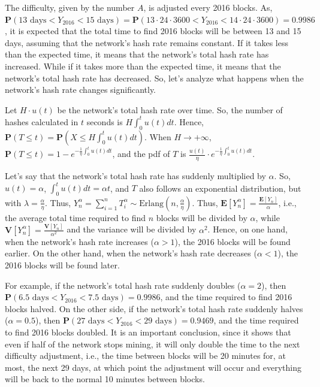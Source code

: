 The difficulty, given by the number $A$, is adjusted every 2016 blocks. As, $\mathbf{P}(13 \text{ days} < Y_{2016} < 15 \text{ days}) = \mathbf{P}(13 \cdot 24 \cdot 3600 < Y_{2016} < 14 \cdot 24 \cdot 3600) = 0.9986$, it is expected that the total time to find 2016 blocks will be between 13 and 15 days, assuming that the network's hash rate remains constant. If it takes less than the expected time, it means that the network's total hash rate has increased. While if it takes more than the expected time, it means that the network's total hash rate has decreased. So, let's analyze what happens when the network's hash rate changes significantly.


Let $H \cdot u(t)$ be the network's total hash rate over time. So, the number of hashes calculated in $t$ seconds is $H \int_0^t u(t) dt$. Hence, $\mathbf{P}(T \leq t) = \mathbf{P}(X \leq H \int_0^t u(t)dt)$. When $H \rightarrow +\infty$, $\mathbf{P}(T \leq t) = 1 - e^{-\frac{1}{\eta} \int_0^t u(t) dt}$, and the pdf of $T$ is $\frac{u(t)}{\eta} \cdot e^{-\frac{1}{\eta} \int_0^t u(t)dt}$.

Let's say that the network's total hash rate has suddenly multiplied by $\alpha$. So, $u(t) = \alpha$, $\int_0^t u(t) dt = \alpha t$, and $T$ also follows an exponential distribution, but with $\lambda = \frac{\alpha}{\eta}$. Thus, $Y_n^\alpha = \sum_{i=1}^{n} T_i^\alpha \sim \text{Erlang}(n, \frac{\alpha}{\eta})$. Thus, $\mathbf{E}[Y_{n}^\alpha] = \frac{\mathbf{E}[Y_{n}]}{\alpha}$, i.e., the average total time required to find $n$ blocks will be divided by $\alpha$, while $\mathbf{V}[Y_{n}^\alpha] = \frac{\mathbf{V}[Y_n]}{\alpha^2}$ and the variance will be divided by $\alpha^2$. Hence, on one hand, when the network's hash rate increases ($\alpha > 1$), the 2016 blocks will be found earlier. On the other hand, when the network's hash rate decreases ($\alpha < 1$), the 2016 blocks will be found later.

For example, if the network's total hash rate suddenly doubles ($\alpha = 2$), then $\mathbf{P}(6.5 \text{ days} < Y_{2016} < 7.5 \text{ days}) = 0.9986$, and the time required to find 2016 blocks halved. On the other side, if the network's total hash rate suddenly halves ($\alpha = 0.5$), then $\mathbf{P}(27 \text{ days} < Y_{2016} < 29 \text{ days}) = 0.9469$, and the time required to find 2016 blocks doubled. It is an important conclusion, since it shows that even if half of the network stops mining, it will only double the time to the next difficulty adjustment, i.e., the time between blocks will be 20 minutes for, at most, the next 29 days, at which point the adjustment will occur and everything will be back to the normal 10 minutes between blocks.

